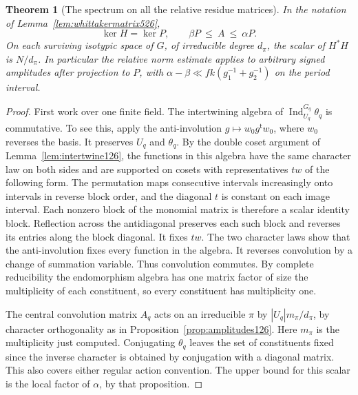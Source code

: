 \documentclass[a4paper,11pt]{article}
\newtheorem{theorem}[proposition]{Theorem}
\theoremstyle{definition}
\theoremstyle{remark}
\numberwithin{equation}{section}
\begin{document}
\begin{theorem}[The spectrum on all the relative residue matrices]
\leavevmode\label{thm:whittakerspectrum527}
In the notation of Lemma~\ref{lem:whittakermatrix526},
\[
       \ker H=\ker P,\qquad \beta P\ \le\ A\ \le\ \alpha P .
\]
On each surviving isotypic space of \(G\), of irreducible degree
\(d_\pi\), the scalar of \(H^*H\) is \(N/d_\pi\).
In particular the relative norm estimate applies to arbitrary signed
amplitudes after projection to \(P\), with
\(\alpha-\beta\ll fk(g_1^{-1}+g_2^{-1})\) on the period interval.
\end{theorem}
\begin{proof}
First work over one finite field. The intertwining algebra of
\(\operatorname{Ind}_{U_q}^{G_q}\theta_q\) is commutative. To see
this, apply the anti-involution \(g\mapsto w_0 g^{\mathsf t}w_0\),
where \(w_0\) reverses the basis. It preserves \(U_q\) and
\(\theta_q\). By the double coset argument of
Lemma~\ref{lem:intertwine126}, the functions in this algebra
have the same character law on both sides and are supported on
cosets with representatives \(tw\) of the following form.
The permutation maps consecutive intervals increasingly onto
intervals in reverse block order, and the diagonal \(t\) is constant
on each image interval. Each nonzero block of the monomial matrix is
therefore a scalar identity block. Reflection across the antidiagonal
preserves each such block and reverses its entries along the block
diagonal. It fixes \(tw\). The two character laws show that the
anti-involution fixes every function in the algebra. It reverses
convolution by a change of summation variable. Thus convolution
commutes. By complete reducibility the endomorphism algebra has one
matrix factor of size the multiplicity of each constituent, so every
constituent has multiplicity one.

The central convolution matrix \(A_q\) acts on an irreducible
\(\pi\) by \(|U_q|m_\pi/d_\pi\), by character orthogonality as in
Proposition~\ref{prop:amplitudes126}. Here \(m_\pi\) is the
multiplicity just computed. Conjugating \(\theta_q\) leaves the
set of constituents fixed since the inverse character is obtained
by conjugation with a diagonal matrix. This also covers either
regular action convention. The upper bound for this scalar is
the local factor of \(\alpha\), by that proposition.


\end{proof}
\end{document}
